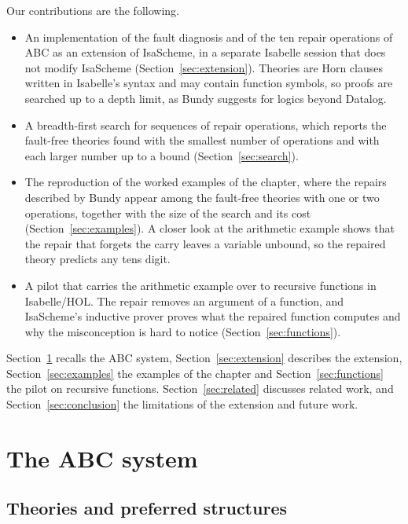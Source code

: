 \documentclass[preprint,12pt]{elsarticle}
\begin{document}
Our contributions are the following.
\begin{itemize}
  \item An implementation of the fault diagnosis and of the ten repair
        operations of ABC as an extension of IsaScheme, in a separate
        Isabelle session that does not modify IsaScheme
        (Section~\ref{sec:extension}). Theories are Horn clauses written in
        Isabelle's syntax and may contain function symbols, so proofs are
        searched up to a depth limit, as Bundy suggests for logics beyond
        Datalog.
  \item A breadth-first search for sequences of repair operations, which
        reports the fault-free theories found with the smallest number of
        operations and with each larger number up to a bound
        (Section~\ref{sec:search}).
  \item The reproduction of the worked examples of the chapter, where the
        repairs described by Bundy appear among the fault-free theories
        with one or two operations, together with the size of the search
        and its cost (Section~\ref{sec:examples}). A closer look at the
        arithmetic example shows that the repair that forgets the carry
        leaves a variable unbound, so the repaired theory predicts any tens
        digit.
  \item A pilot that carries the arithmetic example over to recursive
        functions in Isabelle/HOL. The repair removes an argument of a
        function, and IsaScheme's inductive prover proves what the repaired
        function computes and why the misconception is hard to notice
        (Section~\ref{sec:functions}).
\end{itemize}

Section~\ref{sec:abc} recalls the ABC system, Section~\ref{sec:extension}
describes the extension, Section~\ref{sec:examples} the examples of the
chapter and Section~\ref{sec:functions} the pilot on recursive functions.
Section~\ref{sec:related} discusses related work, and
Section~\ref{sec:conclusion} the limitations of the extension and future
work.

\section{The ABC system}
\label{sec:abc}

\subsection{Theories and preferred structures}
\end{document}
